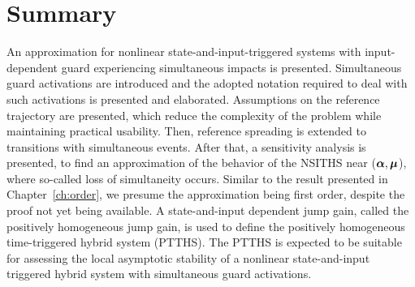 \documentclass[../DC2017114Bouma.tex]{subfiles}
\begin{document}
\section{Summary}
An approximation for nonlinear state-and-input-triggered systems with input-dependent guard experiencing simultaneous impacts is presented. Simultaneous guard activations are introduced and the adopted notation required to deal with such activations is presented and elaborated. Assumptions on the reference trajectory are presented, which reduce the complexity of the problem while maintaining practical usability. Then, reference spreading is extended to transitions with simultaneous events. After that, a sensitivity analysis is presented, to find an approximation of the behavior of the NSITHS near ($\boldsymbol{\alpha},\boldsymbol{\mu}$), where so-called loss of simultaneity occurs. Similar to the result presented in Chapter~\ref{ch:order}, we presume the approximation being first order, despite the proof not yet being available. A state-and-input dependent jump gain, called the positively homogeneous jump gain, is used to define the positively homogeneous time-triggered hybrid system (PTTHS). The PTTHS is expected to be suitable for assessing the local asymptotic stability of a nonlinear state-and-input triggered hybrid system with simultaneous guard activations.
\end{document}
